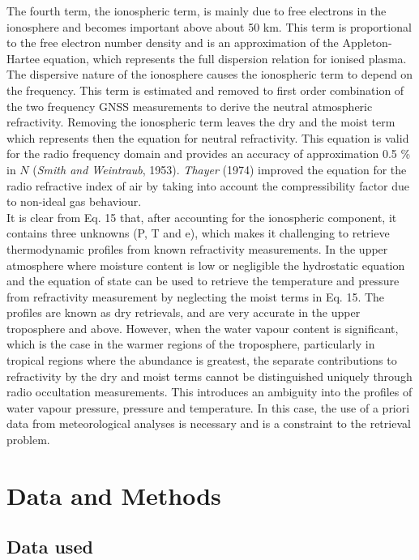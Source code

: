 \documentclass[a4paper,12pt,twoside]{article}
\begin{document}
\noindent The fourth term, the ionospheric term, is mainly due to free electrons in the ionosphere and becomes important above about 50 km. This term is proportional to the free electron number density and is an approximation of the Appleton-Hartee equation, which represents the full dispersion relation for ionised plasma. The dispersive nature of the ionosphere causes the ionospheric term to depend on the frequency. This term is estimated and removed to first order combination of the two frequency GNSS measurements to derive the neutral atmospheric refractivity. Removing the ionospheric term leaves the dry and the moist term which represents then the equation for neutral refractivity. This equation is valid for the radio frequency domain and provides an accuracy of approximation 0.5 \% in $N$ (\textit{Smith and Weintraub}, 1953). \textit{Thayer} (1974) improved the equation for the radio refractive index of air by taking into account the compressibility factor due to non-ideal gas behaviour.\\

\noindent It is clear from Eq. 15 that, after accounting for the ionospheric component, it contains three unknowns (P, T and e), which makes  it challenging to retrieve thermodynamic profiles from known refractivity measurements. In the upper atmosphere where moisture content is low or negligible the hydrostatic equation and the equation of state can be used to retrieve the temperature and pressure from refractivity measurement by neglecting the moist terms in Eq. 15. The profiles  are known as dry retrievals, and are very accurate in the upper troposphere and above. However, when the water vapour content is significant, which is the case in the warmer regions of the troposphere, particularly in tropical regions where the abundance is greatest, the separate contributions to refractivity by the dry and moist terms cannot be distinguished uniquely through radio occultation measurements. This introduces an ambiguity into the profiles of water vapour pressure, pressure and temperature. In this case, the use of a priori data from meteorological analyses is necessary and is a constraint to the retrieval problem. \\

\section{Data and Methods}

\subsection{Data used}
\end{document}
